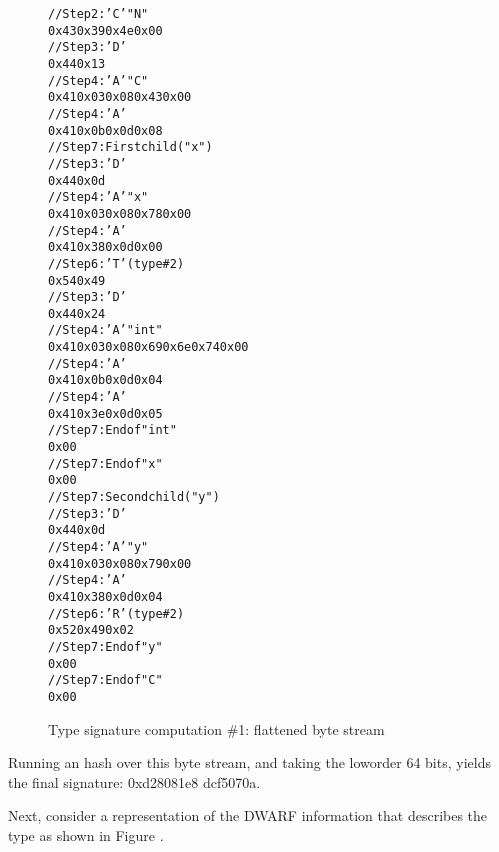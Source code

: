 \begin{figure}
\begin{dwflisting}
\begin{alltt}
// Step 2: 'C' \DWTAGnamespace "N"
0x43 0x39 0x4e 0x00
// Step 3: 'D' \DWTAGstructuretype
0x44 0x13
// Step 4: 'A' \DWATname \DWFORMstring "C"
0x41 0x03 0x08 0x43 0x00
// Step 4: 'A' \DWATbytesize {}
0x41 0x0b 0x0d 0x08
// Step 7: First child ("x")
    // Step 3: 'D' \DWTAGmember
    0x44 0x0d
    // Step 4: 'A' \DWATname \DWFORMstring "x"
    0x41 0x03 0x08 0x78 0x00
    // Step 4: 'A' \DWATdatamemberlocation {}
    0x41 0x38 0x0d 0x00
    // Step 6: 'T' \DWATtype (type \#2)
    0x54 0x49
        // Step 3: 'D' \DWTAGbasetype
        0x44 0x24
        // Step 4: 'A' \DWATname \DWFORMstring "int"
        0x41 0x03 0x08 0x69 0x6e 0x74 0x00
        // Step 4: 'A' \DWATbytesize {}
        0x41 0x0b 0x0d 0x04
        // Step 4: 'A' \DWATencoding \DWFORMsdata \DWATEsigned
        0x41 0x3e 0x0d 0x05
        // Step 7: End of \DWTAGbasetype "int"
        0x00
    // Step 7: End of \DWTAGmember "x"
    0x00
// Step 7: Second child ("y")
    // Step 3: 'D' \DWTAGmember
    0x44 0x0d
    // Step 4: 'A' \DWATname \DWFORMstring "y"
    0x41 0x03 0x08 0x79 0x00
    // Step 4: 'A' \DWATdatamemberlocation {}
    0x41 0x38 0x0d 0x04
    // Step 6: 'R' \DWATtype (type \#2)
    0x52 0x49 0x02
    // Step 7: End of \DWTAGmember "y"
    0x00
// Step 7: End of \DWTAGstructuretype "C"
0x00
\end{alltt}
\end{dwflisting}
\caption{Type signature computation \#1: flattened byte stream}
\label{fig:typesignaturecomputation1flattenedbytestream}
\end{figure}

Running an \MDfive{} hash over this byte stream, and taking the
low\dash order 64 bits, yields the final signature: 
0xd28081e8 dcf5070a.

Next, consider a representation of the DWARF information that
describes the type  as shown in 
Figure .

